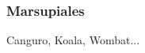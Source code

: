 \documentclass{beamer}
\begin{document}
\begin{frame}
    \frametitle{Marsupiales}
    Canguro, Koala, Wombat...
\end{frame}
\end{document}
